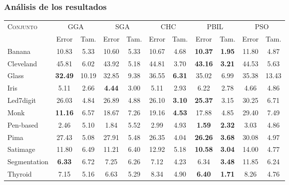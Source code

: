 \blindtext

\subsubsection{Análisis de los resultados}

\blindtext

\begin{table}[h!]
\centering
\begin{tabular}{l c c c c c c c c c c}
\hline
\multirow{2}{*}{\textsc{Conjunto}}
	& \multicolumn{2}{c}{GGA}
	& \multicolumn{2}{c}{SGA}
	& \multicolumn{2}{c}{CHC}
	& \multicolumn{2}{c}{PBIL}
	& \multicolumn{2}{c}{PSO}\\\cline{2-11}
 & \scriptsize{Error} & \scriptsize{Tam.}
 & \scriptsize{Error} & \scriptsize{Tam.}
 & \scriptsize{Error} & \scriptsize{Tam.}
 & \scriptsize{Error} & \scriptsize{Tam.}
 & \scriptsize{Error} & \scriptsize{Tam.}\\
\hline
\hline
Banana       & 10.83 &  5.33 & 10.60 & 5.33 & 10.67 & 4.68 & \textbf{10.37} & \textbf{1.95} & 11.80 &  4.87 \\
Cleveland    & 45.81 &  6.02 & 43.92 & 5.18 & 44.81 & 3.70 & \textbf{43.16} & \textbf{3.21} & 44.53 &  5.63 \\
Glass        & \textbf{32.49} & 10.19 & 32.85 & 9.38 & 36.55 & \textbf{6.31} & 35.02 & 6.99 & 35.38 & 13.43 \\
Iris         &  5.11 &  {2.66} &  \textbf{4.44} & 3.00 &  5.11 & 2.93 &  6.22 & 2.78 &  4.66 &  4.86 \\
Led7digit    & 26.03 &  4.84 & 26.89 & 4.88 & 26.10 & \textbf{3.10} & \textbf{25.37} & 3.15 & 30.25 &  6.71 \\
Monk         & \textbf{11.16} &  6.57 & 18.67 & 7.26 & 19.16 & \textbf{4.53} & 17.88 & 4.85 & 29.40 &  7.49 \\
Pen-based    &  2.46 &  5.10 &  1.84 & 5.52 &  2.99 & 4.93 & \textbf{1.59} & \textbf{2.32} &  3.03 &  4.86 \\
Pima         & 27.43 &  5.08 & 27.91 & 5.48 & 26.35 & 4.04 & \textbf{26.26} & \textbf{3.68} & 30.08 &  4.97 \\
Satimage     & 11.80 &  6.49 & 11.21 & 6.40 & 12.92 & 5.18 & \textbf{10.58} & \textbf{3.04} & 14.00 &  4.77 \\
Segmentation & \textbf{6.33} &  6.72 &  7.25 & 6.26 &  7.12 & 4.23 &  6.34 & \textbf{3.48} & 11.85 &  6.24 \\
Thyroid      &  7.15 &  5.16 &  6.63 & 5.29 &  8.34 & 4.90 & \textbf{6.40} & \textbf{1.71} &  8.26 &  4.76 \\

\end{tabular}
\end{table}
